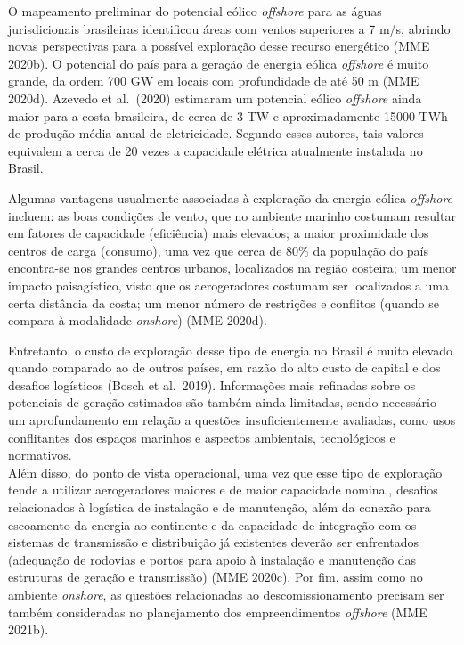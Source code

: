 \documentclass[
  oneside]{scrbook}
\begin{document}
O mapeamento preliminar do potencial eólico \emph{offshore} para as águas jurisdicionais brasileiras identificou áreas com ventos superiores a 7 m/s, abrindo novas perspectivas para a possível exploração desse recurso energético (MME 2020b). O potencial do país para a geração de energia eólica \emph{offshore} é muito grande, da ordem 700 GW em locais com profundidade de até 50 m (MME 2020d). Azevedo et al.~(2020) estimaram um potencial eólico \emph{offshore} ainda maior para a costa brasileira, de cerca de 3 TW e aproximadamente 15000 TWh de produção média anual de eletricidade. Segundo esses autores, tais valores equivalem a cerca de 20 vezes a capacidade elétrica atualmente instalada no Brasil.

Algumas vantagens usualmente associadas à exploração da energia eólica \emph{offshore} incluem: as boas condições de vento, que no ambiente marinho costumam resultar em fatores de capacidade (eficiência) mais elevados; a maior proximidade dos centros de carga (consumo), uma vez que cerca de 80\% da população do país encontra-se nos grandes centros urbanos, localizados na região costeira; um menor impacto paisagístico, visto que os aerogeradores costumam ser localizados a uma certa distância da costa; um menor número de restrições e conflitos (quando se compara à modalidade \emph{onshore}) (MME 2020d).

Entretanto, o custo de exploração desse tipo de energia no Brasil é muito elevado quando comparado ao de outros países, em razão do alto custo de capital e dos desafios logísticos (Bosch et al.~2019). Informações mais refinadas sobre os potenciais de geração estimados são também ainda limitadas, sendo necessário um aprofundamento em relação a questões insuficientemente avaliadas, como usos conflitantes dos espaços marinhos e aspectos ambientais, tecnológicos e normativos.\\
Além disso, do ponto de vista operacional, uma vez que esse tipo de exploração tende a utilizar aerogeradores maiores e de maior capacidade nominal, desafios relacionados à logística de instalação e de manutenção, além da conexão para escoamento da energia ao continente e da capacidade de integração com os sistemas de transmissão e distribuição já existentes deverão ser enfrentados (adequação de rodovias e portos para apoio à instalação e manutenção das estruturas de geração e transmissão) (MME 2020c). Por fim, assim como no ambiente \emph{onshore}, as questões relacionadas ao descomissionamento precisam ser também consideradas no planejamento dos empreendimentos \emph{offshore} (MME 2021b).
\end{document}
